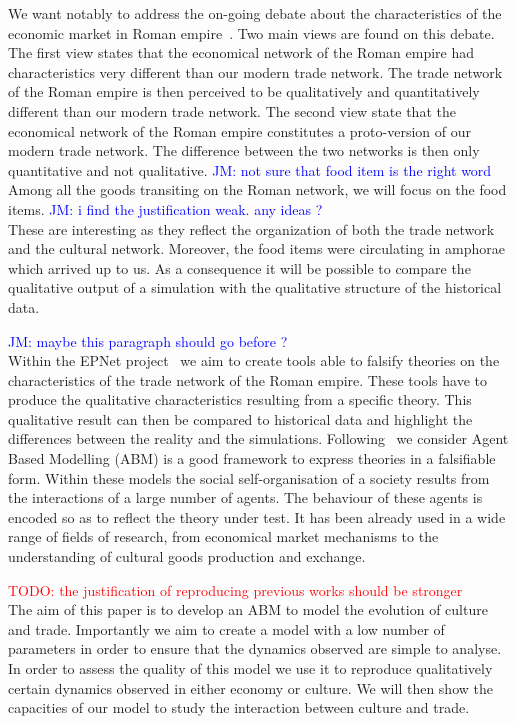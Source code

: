 \documentclass{wscpaperproc}
\newcommand{\memo}[2]{\textcolor{#1}{#2}}
\newcommand{\todo}[1]{\memo{red}{TODO: #1\\}}
\newcommand{\jm}[1]{\memo{blue}{JM: #1\\}}
\begin{document}
We want notably to address the on-going debate about the characteristics of the economic market in Roman empire~\cite{polanyi_trade_1957}. Two main views are found on this debate. The first view states that the economical network of the Roman empire had characteristics very different than our modern trade network. The trade network of the Roman empire is then perceived to be qualitatively and quantitatively different than our modern trade network. The second view state that the economical network of the Roman empire constitutes a proto-version of our modern trade network. The difference between the two networks is then only quantitative and not qualitative. 
\jm{not sure that food item is the right word}
Among all the goods transiting on the Roman network, we will focus on the food items. 
\jm{i find the justification weak. any ideas ?}
These are interesting as they reflect the organization of both the trade network and the cultural network. Moreover, the food items were circulating in amphorae which arrived up to us. As a consequence it will be possible to compare the qualitative output of a simulation with the qualitative structure of the historical data.

\jm{maybe this paragraph should go before ?}
Within the EPNet project~\cite{remesal_epnet_2014} we aim to create tools able to falsify theories on the characteristics of the trade network of the Roman empire. These tools have to produce the qualitative characteristics resulting from a specific theory. This qualitative result can then be compared to historical data and highlight the differences between the reality and the simulations. Following~\cite{epstein_growing_1996,lake_trends_2014,kohler_dynamics_2000,tesfatsion_agent-based_2003,epstein_why_2008} we consider Agent Based Modelling (ABM) is a good framework to express theories in a falsifiable form. Within these models the social self-organisation of a society results from the interactions of a large number of agents. The behaviour of these agents is encoded so as to reflect the theory under test. It has been already used in a wide range of fields of research, from economical market mechanisms to the understanding of cultural goods production and exchange.

\todo{the justification of reproducing previous works should be stronger}
The aim of this paper is to develop an ABM to model the evolution of culture and trade. Importantly we aim to create a model with a low number of parameters in order to ensure that the dynamics observed are simple to analyse. In order to assess the quality of this model we use it to reproduce qualitatively certain dynamics observed in either economy or culture. We will then show the capacities of our model to study the interaction between culture and trade.
\end{document}
